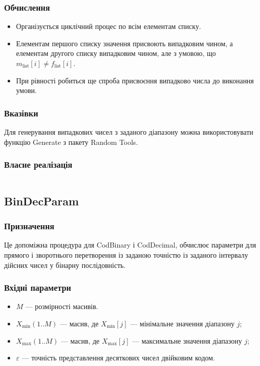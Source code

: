 \documentclass[a4paper, 12pt]{article}
\numberwithin{equation}{section}
\begin{document}
\subsubsection*{Обчислення}

\begin{itemize}
    \item Організується циклічний процес по всім елементам списку. 
    \item Елементам першого списку значення присвоють випадковим чином, а елементам другого списку випадковим чином, але з умовою, що $m_{\text{list}}[i] \ne f_{\text{list}}[i]$.
    \item При рівності робиться ще спроба присвоєння випадково числа до виконання умови.
\end{itemize}

\subsubsection*{Вказівки}

Для генерування випадкових чисел з заданого діапазону можна використовувати функцію Generate з пакету Random Tools.

\subsubsection*{Власне реалізація}

\inputminted[firstline=6, lastline=12]{python}{../code/parents.py}

\subsection{BinDecParam}

\subsubsection*{Призначення}

Це допоміжна процедура для CodBinary і CodDecimal, обчислює параметри для прямого і зворотнього перетворення із заданою точністю із заданого інтервалу дійсних чисел у бінарну послідовність. 

\subsubsection*{Вхідні параметри}

\begin{itemize}
    \item $M$ --- розмірності масивів.
    \item $X_{\text{min}}(1..M)$ --- масив, де $X_{\text{min}}[j]$ --- мінімальне значення діапазону $j$;
    \item $X_{\text{max}}(1..M)$ --- масив, де $X_{\text{max}}[j]$ --- максимальне значення діапазону $j$;
    \item $\varepsilon$ --- точність представлення десяткових чисел двійковим кодом.
\end{itemize}
\end{document}
